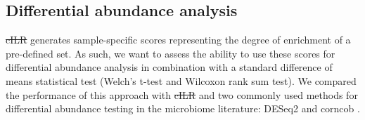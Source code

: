 \documentclass[10pt,letterpaper]{article}
\providecommand{\DIFaddtex}[1]{{\protect\color{blue}\uwave{#1}}} %
\providecommand{\DIFdeltex}[1]{{\protect\color{red}\sout{#1}}}                      %
\providecommand{\DIFaddbegin}{} %
\providecommand{\DIFaddend}{} %
\providecommand{\DIFdelbegin}{} %
\providecommand{\DIFdelend}{} %
\providecommand{\DIFadd}[1]{\texorpdfstring{\DIFaddtex{#1}}{#1}} %
\providecommand{\DIFdel}[1]{\texorpdfstring{\DIFdeltex{#1}}{}} %
\newcommand{\DIFscaledelfig}{0.5}
\newlength{\DIFdelgraphicswidth} %
\newlength{\DIFdelgraphicsheight} %
\newcommand{\DIFaddincludegraphics}[2][]{{\color{blue}\fbox{\DIFOincludegraphics[#1]{#2}}}} %
\newcommand{\DIFdelincludegraphics}[2][]{%
\sbox{\DIFdelgraphicsbox}{\DIFOincludegraphics[#1]{#2}}%
\settoboxwidth{\DIFdelgraphicswidth}{\DIFdelgraphicsbox} %
\settoboxtotalheight{\DIFdelgraphicsheight}{\DIFdelgraphicsbox} %
\scalebox{\DIFscaledelfig}{%
\parbox[b]{\DIFdelgraphicswidth}{\usebox{\DIFdelgraphicsbox}\\[-\baselineskip] \rule{\DIFdelgraphicswidth}{0em}}\llap{\resizebox{\DIFdelgraphicswidth}{\DIFdelgraphicsheight}{%
\setlength{\unitlength}{\DIFdelgraphicswidth}%
\begin{picture}(1,1)%
\thicklines\linethickness{2pt} %
{\color[rgb]{1,0,0}\put(0,0){\framebox(1,1){}}}%
{\color[rgb]{1,0,0}\put(0,0){\line( 1,1){1}}}%
{\color[rgb]{1,0,0}\put(0,1){\line(1,-1){1}}}%
\end{picture}%
}\hspace*{3pt}}} %
} %
\DeclareRobustCommand{\DIFaddbegin}{\DIFOaddbegin \let\includegraphics\DIFaddincludegraphics} %
\DeclareRobustCommand{\DIFaddend}{\DIFOaddend \let\includegraphics\DIFOincludegraphics} %
\DeclareRobustCommand{\DIFdelbegin}{\DIFOdelbegin \let\includegraphics\DIFdelincludegraphics} %
\DeclareRobustCommand{\DIFdelend}{\DIFOaddend \let\includegraphics\DIFOincludegraphics} %
\begin{document}
\subsection*{Differential abundance analysis}
\DIFdelbegin \DIFdel{cILR }\DIFdelend \DIFaddbegin \DIFadd{CBEA }\DIFaddend generates sample-specific scores representing the degree of enrichment of a pre-defined set. As such, we want to assess the ability to use these scores for differential abundance analysis in combination with a standard difference of means statistical test (Welch's t-test and Wilcoxon rank sum test). We compared the performance of this approach with \DIFdelbegin \DIFdel{cILR }\DIFdelend \DIFaddbegin \DIFadd{CBEA }\DIFaddend and two commonly used methods for differential abundance testing in the microbiome literature: DESeq2 \cite{love2014} and corncob \cite{martin2020}.   
\end{document}
